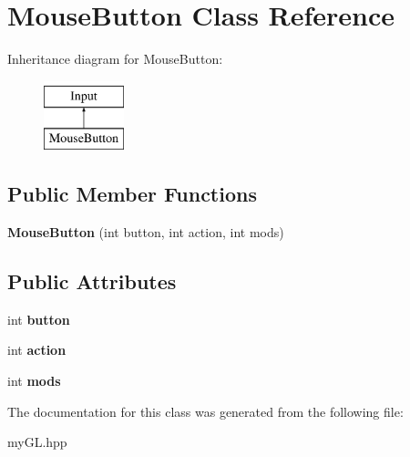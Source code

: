 \hypertarget{classMouseButton}{}\section{Mouse\+Button Class Reference}
\label{classMouseButton}
Inheritance diagram for Mouse\+Button\+:\begin{figure}[H]
\begin{center}
\leavevmode
\includegraphics[height=2.000000cm]{classMouseButton}
\end{center}
\end{figure}
\subsection*{Public Member Functions}
\begin{DoxyCompactItemize}
\item 
{\bfseries Mouse\+Button} (int button, int action, int mods)\hypertarget{classMouseButton_ad2a2ab9c8a5d0a95bae134566462136c}{}\label{classMouseButton_ad2a2ab9c8a5d0a95bae134566462136c}

\end{DoxyCompactItemize}
\subsection*{Public Attributes}
\begin{DoxyCompactItemize}
\item 
int {\bfseries button}\hypertarget{classMouseButton_ada6d6e1d81eaedf7092a8617af6ede6b}{}\label{classMouseButton_ada6d6e1d81eaedf7092a8617af6ede6b}

\item 
int {\bfseries action}\hypertarget{classMouseButton_a7f22ddcecc4bfe282f7c8b150e28704b}{}\label{classMouseButton_a7f22ddcecc4bfe282f7c8b150e28704b}

\item 
int {\bfseries mods}\hypertarget{classMouseButton_a1fa333819593583ccc090db9330018ad}{}\label{classMouseButton_a1fa333819593583ccc090db9330018ad}

\end{DoxyCompactItemize}


The documentation for this class was generated from the following file\+:\begin{DoxyCompactItemize}
\item 
my\+G\+L.\+hpp\end{DoxyCompactItemize}
